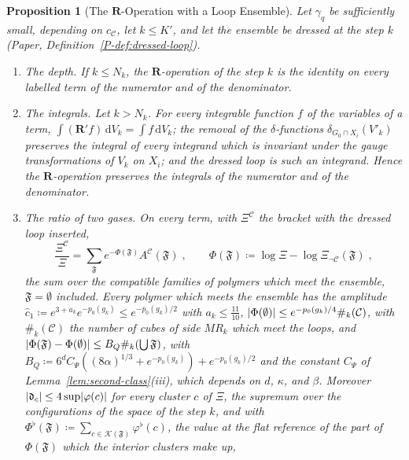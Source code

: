 \documentclass[11pt]{preprint}
\newcommand{\dd}{\mathrm{d}}
\DeclarePairedDelimiter{\abs}{\lvert}{\rvert}
\numberwithin{equation}{section}
\newtheorem{proposition}{Proposition}
\theoremstyle{definition}
\theoremstyle{remark}
\theoremstyle{plain}
\begin{document}
\begin{proposition}[The $\mathbf R$-Operation with a Loop Ensemble]\label{prop:r-operation}
Let $\gamma_q$ be sufficiently small, depending on $c_{\mathcal C}$, let $k \leq K'$, and let the ensemble be dressed at the step $k$ (Paper, Definition~\ref{P-def:dressed-loop}).
\begin{enumerate}[label=(\roman*)]
\item \emph{The depth.} If $k \leq N_k$, the $\mathbf R$-operation of the step $k$ is the identity on every labelled term of the numerator and of the denominator.
\item \emph{The integrals.} Let $k > N_k$. For every integrable function $f$ of the variables of a term, $\int(\mathbf R'f)\,\dd V_k = \int f\,\dd V_k$; the removal of the $\delta$-functions $\delta_{G_0 \cap X_i}(V'_k)$ preserves the integral of every integrand which is invariant under the gauge transformations of $V_k$ on $X_i$; and the dressed loop is such an integrand. Hence the $\mathbf R$-operation preserves the integrals of the numerator and of the denominator.
\item \emph{The ratio of two gases.} On every term, with $\Xi^{\mathcal C}$ the bracket with the dressed loop inserted,
\begin{equation}\label{eq:ratio-of-gases}
    \frac{\Xi^{\mathcal C}}{\Xi} = \sum_{\mathfrak F}e^{-\Phi(\mathfrak F)}A^{\mathcal C}(\mathfrak F)\;,
    \qquad
    \Phi(\mathfrak F) \coloneqq \log\Xi - \log\Xi_{\neg\mathcal C}(\mathfrak F)\;,
\end{equation}
the sum over the compatible families of polymers which meet the ensemble, $\mathfrak F = \emptyset$ included. Every polymer which meets the ensemble has the amplitude $\hat c_1 \coloneqq e^{3+a_k}e^{-p_0(g_k)} \leq e^{-p_0(g_k)/2}$ with $a_k \leq \frac{11}{10}$, $\abs{\Phi(\emptyset)} \leq e^{-p_0(g_k)/4}\#_k(\mathcal C)$, with $\#_k(\mathcal C)$ the number of cubes of side $MR_k$ which meet the loops, and $\abs{\Phi(\mathfrak F) - \Phi(\emptyset)} \leq B_Q\#_k(\bigcup\mathfrak F)$, with $B_Q \coloneqq 6^dC_\Psi((8\alpha)^{1/3} + e^{-p_0(g_k)}) + e^{-p_0(g_k)/2}$ and the constant $C_\Psi$ of Lemma~\ref{lem:second-class}(iii), which depends on $d$, $\kappa$, and $\beta$. Moreover $\abs{\mathfrak d_c} \leq 4\sup\abs{\varphi(c)}$ for every cluster $c$ of $\Xi$, the supremum over the configurations of the space of the step $k$, and with $\Phi^\flat(\mathfrak F) \coloneqq \sum_{c \in \mathcal K(\mathfrak F)}\varphi^\flat(c)$, the value at the flat reference of the part of $\Phi(\mathfrak F)$ which the interior clusters make up,

\end{enumerate}
\end{proposition}
\end{document}
